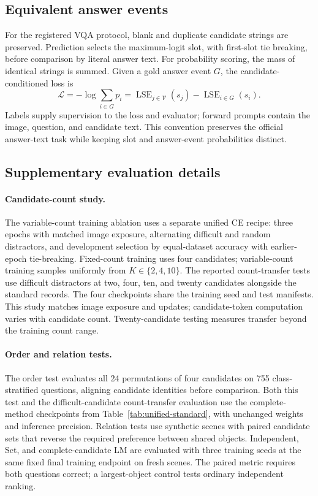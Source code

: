 \subsection{Equivalent answer events}
For the registered VQA protocol, blank and duplicate candidate strings are preserved. Prediction selects the maximum-logit slot, with first-slot tie breaking, before comparison by literal answer text. For probability scoring, the mass of identical strings is summed. Given a gold answer event $G$, the candidate-conditioned loss is
\begin{equation}
 \mathcal L=-\log\sum_{i\in G}p_i
 =\operatorname{LSE}_{j\in\mathcal V}(s_j)-\operatorname{LSE}_{i\in G}(s_i).
\end{equation}
Labels supply supervision to the loss and evaluator; forward prompts contain the image, question, and candidate text. This convention preserves the official answer-text task while keeping slot and answer-event probabilities distinct.

\subsection{Supplementary evaluation details}
\paragraph{Candidate-count study.}
The variable-count training ablation uses a separate unified CE recipe: three epochs with matched image exposure, alternating difficult and random distractors, and development selection by equal-dataset accuracy with earlier-epoch tie-breaking. Fixed-count training uses four candidates; variable-count training samples uniformly from $K\in\{2,4,10\}$. The reported count-transfer tests use difficult distractors at two, four, ten, and twenty candidates alongside the standard records. The four checkpoints share the training seed and test manifests. This study matches image exposure and updates; candidate-token computation varies with candidate count. Twenty-candidate testing measures transfer beyond the training count range.

\paragraph{Order and relation tests.}
The order test evaluates all 24 permutations of four candidates on 755 class-stratified questions, aligning candidate identities before comparison. Both this test and the difficult-candidate count-transfer evaluation use the complete-method checkpoints from Table~\ref{tab:unified-standard}, with unchanged weights and inference precision. Relation tests use synthetic scenes with paired candidate sets that reverse the required preference between shared objects. Independent, Set, and complete-candidate LM are evaluated with three training seeds at the same fixed final training endpoint on fresh scenes. The paired metric requires both questions correct; a largest-object control tests ordinary independent ranking.

